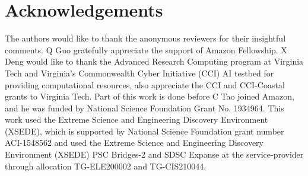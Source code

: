 \documentclass{article}
\theoremstyle{plain}
\theoremstyle{definition}
\theoremstyle{remark}
\begin{document}
		\section*{Acknowledgements}
		\vspace{-6pt}
		The authors would like to thank the anonymous reviewers for their insightful comments.
		Q Guo gratefully appreciate the support of Amazon Fellowship. X Deng would like to thank the Advanced Research Computing program at Virginia Tech and Virginia’s Commonwealth Cyber Initiative (CCI) AI testbed for providing computational resources, also appreciate the CCI and CCI-Coastal grants to Virginia Tech. Part of this work is done before C Tao joined Amazon, and he was funded by National Science Foundation Grant No. 1934964. This work used the Extreme Science and Engineering Discovery Environment (XSEDE), which is supported by National Science Foundation grant number ACI-1548562 \citep{towns2014xsede} and used the Extreme Science and Engineering Discovery Environment (XSEDE) PSC Bridges-2 and SDSC Expanse at the service-provider through allocation TG-ELE200002 and TG-CIS210044. 
		
		
		
		
		
		
\end{document}
